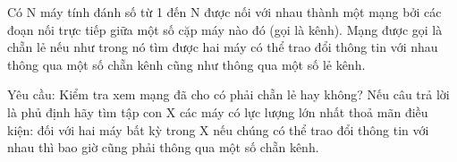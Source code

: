 Có N máy tính đánh số từ 1 đến N được nối với nhau thành một mạng bởi các đoạn nối trực tiếp giữa một số cặp máy nào đó (gọi là kênh). Mạng   được gọi là   chẵn lẻ   nếu như trong nó tìm được hai máy có thể trao đổi thông tin với nhau thông qua một số chẵn kênh cũng như thông qua một   số lẻ kênh.  

   Yêu cầu: Kiểm tra xem mạng đã cho có phải   chẵn lẻ   hay không? Nếu câu trả lời là phủ định hãy tìm tập con X các máy có lực lượng lớn   nhất thoả mãn điều kiện: đối với hai máy bất kỳ trong X nếu chúng có thể trao đổi thông tin với nhau thì bao giờ cũng phải thông qua một số chẵn kênh.